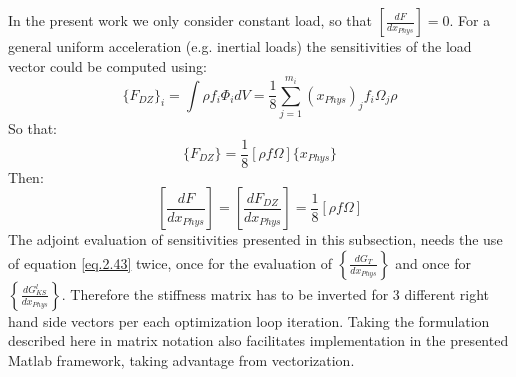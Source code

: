  In the present work we only consider constant load, so that $\left[\frac{dF}{dx_{Phys}}\right]=0$.
 For a general uniform acceleration (e.g. inertial loads) the sensitivities of the load vector could be computed using:
 \begin{equation}
 \lbrace F_{DZ} \rbrace_i = \int \rho  f_i  \Phi_i dV=\frac{1}{8}\sum\limits_{j=1}^{m_i}(x_{Phys})_jf_i\Omega_j\rho
 \end{equation}
 So that:
 \begin{equation}
 \lbrace F_{DZ}\rbrace=\frac{1}{8}\left[\rho f\Omega \right]\lbrace x_{Phys} \rbrace
 \end{equation}
 Then:
 \begin{equation}
 \left[\frac{dF}{dx_{Phys}}\right]=\left[\frac{dF_{DZ}}{dx_{Phys}}\right]=\frac{1}{8}\left[\rho f \Omega\right]
 \end{equation}
   The adjoint evaluation of sensitivities presented in this subsection, needs the use of equation \ref{eq.2.43} twice, once for the evaluation of $\left\lbrace\frac{d G_T}{dx_{Phys}}\right\rbrace$ and once for $\left\lbrace\frac{d G_{KS}^l}{dx_{Phys}}\right\rbrace$.
   Therefore the stiffness matrix has to be inverted for 3 different right hand side vectors per each optimization loop iteration. Taking the formulation described here in matrix notation also facilitates implementation in the presented Matlab framework, taking advantage from vectorization.
